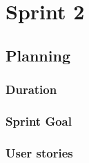 \chapter{Sprint 2}
\section{Planning}
\subsection{Duration}
\subsection{Sprint Goal}
\subsection{User stories}


